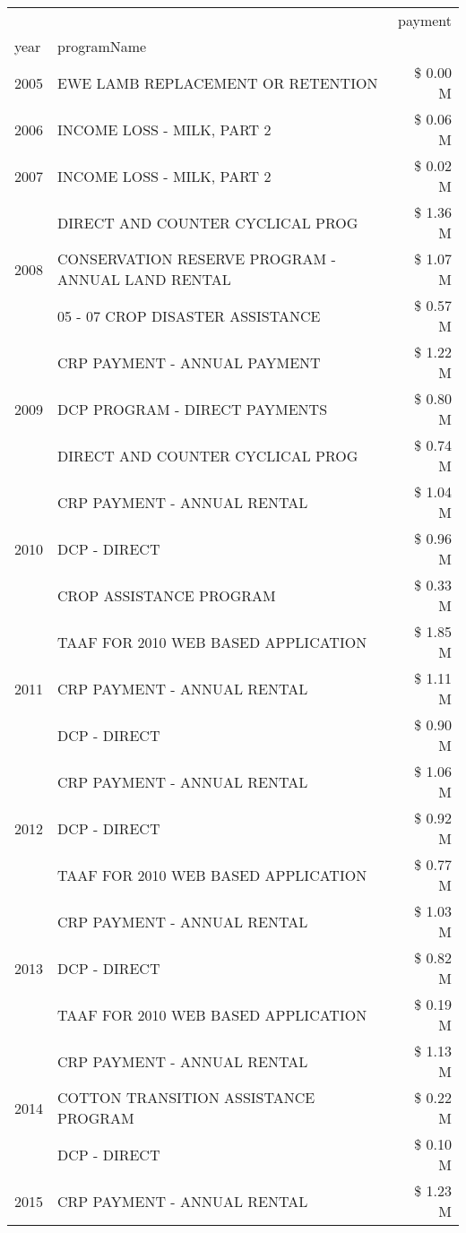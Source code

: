 \begin{tabular}{llr}
\toprule
 &  & payment \\
year & programName &  \\
\midrule
2005 & EWE LAMB REPLACEMENT OR RETENTION & \$ 0.00 M \\
\cline{1-3}
2006 & INCOME LOSS - MILK, PART 2 & \$ 0.06 M \\
\cline{1-3}
2007 & INCOME LOSS - MILK, PART 2 & \$ 0.02 M \\
\cline{1-3}
\multirow[t]{3}{*}{2008} & DIRECT AND COUNTER CYCLICAL PROG & \$ 1.36 M \\
 & CONSERVATION RESERVE PROGRAM - ANNUAL LAND RENTAL & \$ 1.07 M \\
 & 05 - 07 CROP DISASTER ASSISTANCE & \$ 0.57 M \\
\cline{1-3}
\multirow[t]{3}{*}{2009} & CRP PAYMENT - ANNUAL PAYMENT & \$ 1.22 M \\
 & DCP PROGRAM - DIRECT PAYMENTS & \$ 0.80 M \\
 & DIRECT AND COUNTER CYCLICAL PROG & \$ 0.74 M \\
\cline{1-3}
\multirow[t]{3}{*}{2010} & CRP PAYMENT - ANNUAL RENTAL & \$ 1.04 M \\
 & DCP - DIRECT & \$ 0.96 M \\
 & CROP ASSISTANCE PROGRAM & \$ 0.33 M \\
\cline{1-3}
\multirow[t]{3}{*}{2011} & TAAF FOR 2010 WEB BASED APPLICATION & \$ 1.85 M \\
 & CRP PAYMENT - ANNUAL RENTAL & \$ 1.11 M \\
 & DCP - DIRECT & \$ 0.90 M \\
\cline{1-3}
\multirow[t]{3}{*}{2012} & CRP PAYMENT - ANNUAL RENTAL & \$ 1.06 M \\
 & DCP - DIRECT & \$ 0.92 M \\
 & TAAF FOR 2010 WEB BASED APPLICATION & \$ 0.77 M \\
\cline{1-3}
\multirow[t]{3}{*}{2013} & CRP PAYMENT - ANNUAL RENTAL & \$ 1.03 M \\
 & DCP - DIRECT & \$ 0.82 M \\
 & TAAF FOR 2010 WEB BASED APPLICATION & \$ 0.19 M \\
\cline{1-3}
\multirow[t]{3}{*}{2014} & CRP PAYMENT - ANNUAL RENTAL & \$ 1.13 M \\
 & COTTON TRANSITION ASSISTANCE PROGRAM & \$ 0.22 M \\
 & DCP - DIRECT & \$ 0.10 M \\
\cline{1-3}
\multirow[t]{3}{*}{2015} & CRP PAYMENT - ANNUAL RENTAL & \$ 1.23 M \\

\end{tabular}
